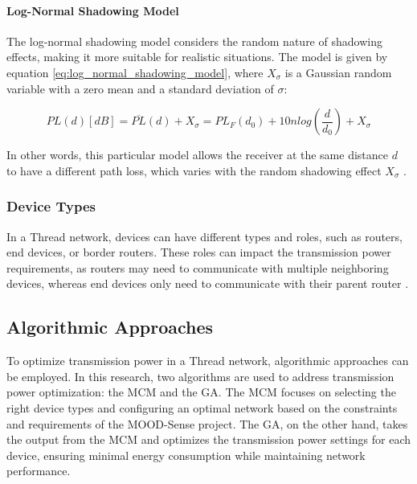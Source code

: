 \paragraph{Log-Normal Shadowing Model}

The log-normal shadowing model considers the random nature of shadowing effects, making it more suitable for realistic situations. The model is given by equation \ref{eq:log_normal_shadowing_model}, where $X_\sigma$ is a Gaussian random variable with a zero mean and a standard deviation of $\sigma$:

\begin{equation}\label{eq:log_normal_shadowing_model}
    PL\left(d\right)\left[dB\right]=\overline{PL}\left(d\right)+X_\sigma=PL_F\left(d_0\right)+10nlog\left(\frac{d}{d_0}\right)+X_\sigma
\end{equation}

In other words, this particular model allows the receiver at the same distance $d$ to have a different path loss, which varies with the random shadowing effect $X_\sigma$ \cite{cho2010mimo}.

\subsubsection{Device Types}

In a Thread network, devices can have different types and roles, such as routers, end devices, or border routers. These roles can impact the transmission power requirements, as routers may need to communicate with multiple neighboring devices, whereas end devices only need to communicate with their parent router \cite{Thread_Group_Fundamentals}.

\subsection{Algorithmic Approaches}

To optimize transmission power in a Thread network, algorithmic approaches can be employed. In this research, two algorithms are used to address transmission power optimization: the \gls{MCM} and the \gls{GA}. The \gls{MCM} focuses on selecting the right device types and configuring an optimal network based on the constraints and requirements of the MOOD-Sense project. The \gls{GA}, on the other hand, takes the output from the \gls{MCM} and optimizes the transmission power settings for each device, ensuring minimal energy consumption while maintaining network performance.

